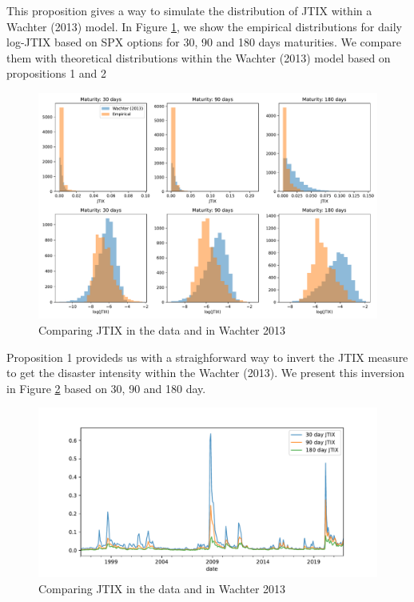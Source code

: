 \documentclass[11pt]{article}
\begin{document}
This proposition gives a way to simulate the distribution of JTIX within a Wachter (2013) model. In Figure \ref{fig:JTIX_wachter2013}, we show the empirical distributions for daily log-JTIX based on SPX options for 30, 90 and 180 days maturities. We compare them with theoretical distributions within the Wachter (2013) model based on propositions 1 and 2

\begin{figure}[htbp!]
    \includegraphics[width=\textwidth]{../../SS_figures/JTIX_wachter2013.pdf}
    \caption{Comparing JTIX in the data and in Wachter 2013}
    \label{fig:JTIX_wachter2013}
\end{figure}

Proposition 1 provideds us with a straighforward way to invert the JTIX measure to get the disaster intensity within the Wachter (2013). We present this inversion in Figure \ref{fig:intensity_from_JTIX} based on 30, 90 and 180 day.

\begin{figure}[htbp!]
    \includegraphics[width=\textwidth]{../../SS_figures/intensity_from_JTIX.pdf}
    \caption{Comparing JTIX in the data and in Wachter 2013}
    \label{fig:intensity_from_JTIX}
\end{figure}
\end{document}
